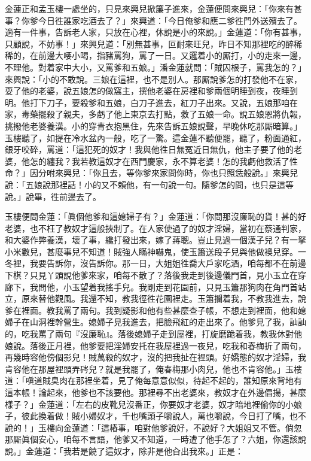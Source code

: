 金蓮正和孟玉樓一處坐的，只見來興兒掀簾子進來，金蓮便問來興兒：「你來有甚事？你爹今日徃誰家吃酒去了？」來興道：「今日俺爹和應二爹徃門外送殯去了。適有一件事，告訴老人家，只放在心裡，休說是小的來說。」金蓮道：「你有甚事，只顧說，不妨事！」來興兒道：「別無甚事，叵耐來旺兒，昨日不知那裡吃的醉稀稀的，在前邊大喓小喝，指豬罵狗，罵了一日。又邏着小的厮打，小的走來一邊，不理他。對着家中大小，又罵爹和五娘。」潘金蓮就問：「賊囚根子，罵我怎的？」來興說：「小的不敢說。三娘在這裡，也不是別人。那厮說爹怎的打發他不在家，耍了他的老婆，說五娘怎的做窩主，撰他老婆在房裡和爹兩個明睡到夜，夜睡到明。他打下刀子，要殺爹和五娘，白刀子進去，紅刀子出來。又說，五娘那咱在家，毒藥擺殺了親夫，多虧了他上東京去打點，救了五娘一命。說五娘恩將仇報，挑撥他老婆養漢。小的穿青衣抱黑住，先來告訴五娘說聲，早晚休吃那厮暗算。」玉樓聽了，如提在冷水盆內一般，吃了一驚。這金蓮不聽便罷，聽了，粉面通紅，銀牙咬碎，罵道：「這犯死的奴才！我與他徃日無冤近日無仇，他主子要了他的老婆，他怎的纏我？我若教這奴才在西門慶家，永不算老婆！怎的我虧他救活了性命？」因分咐來興兒：「你且去，等你爹來家問你時，你也只照恁般說。」來興兒說：「五娘說那裡話！小的又不賴他，有一句說一句。隨爹怎的問，也只是這等說。」{}說畢，徃前邊去了。

玉樓便問金蓮：「眞個他爹和這媳婦子有？」{}金蓮道：「你問那沒廉恥的貨！甚的好老婆，也不枉了教奴才這般挾制了。在人家使過了的奴才淫婦，當初在蔡通判家，和大婆作弊養漢，壞了事，纔打發出來，嫁了蔣聰。{}豈止見過一個漢子兒？有一拏小米數兒，甚麼事兒不知道！賊強人瞞神嚇鬼，使玉簫送段子兒與他做襖兒穿。一冬裡，我要告訴你，沒告訴你。那一日，大姐姐徃喬大戶家吃酒，咱每都不在前邊下棋？只見丫頭說他爹來家，咱每不散了？落後我走到後邊儀門首，見小玉立在穿廊下，我問他，小玉望着我搖手兒。我剛走到花園前，只見玉簫那狗肉在角門首站立，原來替他觀風。我還不知，教我徑徃花園裡走。玉簫攔着我，不教我進去，說爹在裡面。教我罵了兩句。我到疑影和他有些甚麼查子帳，不想走到裡面，他和媳婦子在山洞裡幹營生。{}媳婦子見我進去，把臉飛紅的走出來了。他爹見了我，訕訕的，吃我罵了兩句『沒廉恥』。落後媳婦子走到屋裡，打旋磨跪着我，教我休對他娘說。落後正月裡，他爹要把淫婦安托在我屋裡過一夜兒，吃我和春梅折了兩句，再幾時容他傍個影兒！賊萬殺的奴才，沒的把我扯在裡頭。好嬌態的奴才淫婦，我肯容他在那屋裡頭弄硶兒？就是我罷了，俺春梅那小肉兒，他也不肯容他。」玉樓道：「嗔道賊臭肉在那裡坐着，見了俺每意意似似，待起不起的，誰知原來背地有這本帳！{}論起來，他爹也不該要他。那裡尋不出老婆來，教奴才在外邊倡揚，甚麼樣子？」金蓮道：「左右的皮靴兒沒番正，你要奴才老婆，奴才暗地裡偷你的小娘子，彼此換着做！賊小婦奴才，千也嘴頭子嚼說人，萬也嚼說，今日打了嘴，也不說的！」{}玉樓向金蓮道：「這樁事，咱對他爹說好，不說好？大姐姐又不管。倘忽那厮眞個安心，咱每不言語，他爹又不知道，一時遭了他手怎了？六姐，你還該說說。」金蓮道：「我若是饒了這奴才，除非是他㒲出我來。」正是：

